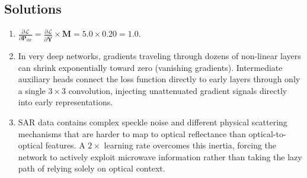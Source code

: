 \subsection*{Solutions}
\begin{enumerate}
    \item $\frac{\partial \mathcal{L}}{\partial \mathbf{P}_{\text{dir}}} = \frac{\partial \mathcal{L}}{\partial \hat{\mathbf{Y}}} \times \mathbf{M} = 5.0 \times 0.20 = 1.0$.
    \item In very deep networks, gradients traveling through dozens of non-linear layers can shrink exponentially toward zero (vanishing gradients). Intermediate auxiliary heads connect the loss function directly to early layers through only a single $3\times 3$ convolution, injecting unattenuated gradient signals directly into early representations.
    \item SAR data contains complex speckle noise and different physical scattering mechanisms that are harder to map to optical reflectance than optical-to-optical features. A $2\times$ learning rate overcomes this inertia, forcing the network to actively exploit microwave information rather than taking the lazy path of relying solely on optical context.
\end{enumerate}
